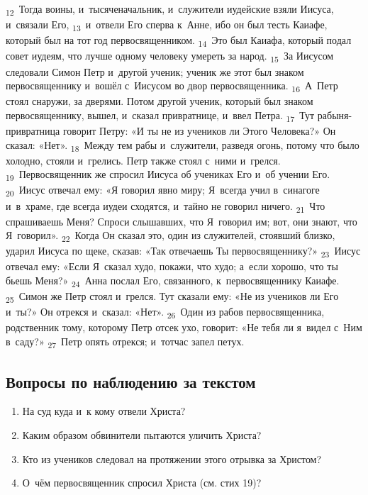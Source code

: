 \documentclass[a4paper,12pt]{article}
\begin{document}
\textsubscript{12}~Тогда воины, и~тысяченачальник, и~служители иудейские взяли Иисуса, и~связали Его, \textsubscript{13}~и~отвели Его сперва к~Анне, ибо он был тесть Каиафе, который был на тот год первосвященником. \textsubscript{14}~Это был Каиафа, который подал совет иудеям, что лучше одному человеку умереть за народ. \textsubscript{15}~За Иисусом следовали Симон Петр и~другой ученик; ученик же этот был знаком первосвященнику и~вошёл с~Иисусом во двор первосвященника. \textsubscript{16}~А~Петр стоял снаружи, за дверями. Потом другой ученик, который был знаком первосвященнику, вышел, и~сказал привратнице, и~ввел Петра. \textsubscript{17}~Тут рабыня-привратница говорит Петру: «И ты не из учеников ли Этого Человека?» Он сказал: «Нет». \textsubscript{18}~Между тем рабы и~служители, разведя огонь, потому что было холодно, стояли и~грелись. Петр также стоял с~ними и~грелся. \textsubscript{19}~Первосвященник же спросил Иисуса об учениках Его и~об учении Его. \textsubscript{20}~Иисус отвечал ему: «Я говорил явно миру; Я~всегда учил в~синагоге и~в~храме, где всегда иудеи сходятся, и~тайно не говорил ничего. \textsubscript{21}~Что спрашиваешь Меня? Спроси слышавших, что Я~говорил им; вот, они знают, что Я~говорил». \textsubscript{22}~Когда Он сказал это, один из служителей, стоявший близко, ударил Иисуса по щеке, сказав: «Так отвечаешь Ты первосвященнику?» \textsubscript{23}~Иисус отвечал ему: «Если Я~сказал худо, покажи, что худо; а~если хорошо, что ты бьешь Меня?» \textsubscript{24}~Анна послал Его, связанного, к~первосвященнику Каиафе. \textsubscript{25}~Симон же Петр стоял и~грелся. Тут сказали ему: «Не из учеников ли Его и~ты?» Он отрекся и~сказал: «Нет». \textsubscript{26}~Один из рабов первосвященника, родственник тому, которому Петр отсек ухо, говорит: «Не тебя ли я~видел с~Ним в~саду?» \textsubscript{27}~Петр опять отрекся; и~тотчас запел петух. 

\subsection*{Вопросы по наблюдению за текстом}
\begin{enumerate}
    \item На суд куда и~к кому отвели Христа? 
    
    \myline
    
    \myline
    \item Каким образом обвинители пытаются уличить Христа? 
    
    \myline
    
    \myline
    \item Кто из учеников следовал на протяжении этого отрывка за Христом? 
    
    \myline
    
    \myline
    \item О~чём первосвященник спросил Христа (см. стих 19)? 
    
    \myline
    
    \myline
\end{enumerate}
\end{document}
